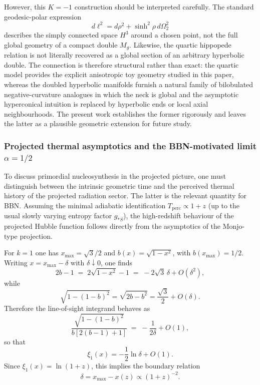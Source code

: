\documentclass[11pt]{article}
\begin{document}
However, this $K=-1$ construction should be interpreted carefully. The standard geodesic-polar expression
\begin{equation}
d\ell^2=d\rho^2+\sinh^2\rho\,d\Omega_2^2
\end{equation}
describes the simply connected space $H^3$ around a chosen point, not the full global geometry of a compact double $M_g$. Likewise, the quartic hippopede relation is not literally recovered as a global section of an arbitrary hyperbolic double. The connection is therefore structural rather than exact: the quartic model provides the explicit anisotropic toy geometry studied in this paper, whereas the doubled hyperbolic manifolds furnish a natural family of bilobulated negative-curvature analogues in which the neck is global and the asymptotic hyperconical intuition is replaced by hyperbolic ends or local axial neighbourhoods. The present work establishes the former rigorously and leaves the latter as a plausible geometric extension for future study.


\subsubsection*{Projected thermal asymptotics and the BBN-motivated limit $\alpha=1/2$}

To discuss primordial nucleosynthesis in the projected picture, one must distinguish between the intrinsic geometric time and the perceived thermal history of the projected radiation sector. The latter is the relevant quantity for BBN. Assuming the minimal adiabatic identification $T_{\mathrm{perc}}\propto 1+z$ (up to the usual slowly varying entropy factor $g_{*S}$), the high-redshift behaviour of the projected Hubble function follows directly from the asymptotics of the Monjo-type projection.

For $k=1$ one has $x_{\max}=\sqrt{3}/2$ and $b(x)=\sqrt{1-x^2}$, with $b(x_{\max})=1/2$. Writing $x=x_{\max}-\delta$ with $\delta\downarrow0$, one finds
\begin{equation}
2b-1\;=\;2\sqrt{1-x^2}-1\;=\;-2\sqrt{3}\,\delta+O(\delta^2),
\end{equation}
while
\begin{equation}
\sqrt{1-(1-b)^2}=\sqrt{2b-b^2}=\frac{\sqrt{3}}{2}+O(\delta).
\end{equation}
Therefore the line-of-sight integrand behaves as
\begin{equation}
\frac{\sqrt{1-(1-b)^2}}{b[2(b-1)+1]}
\;=\; -\frac{1}{2\delta}+O(1),
\end{equation}
so that
\begin{equation}
\xi_1(x)= -\frac12\ln\delta + O(1).
\end{equation}
Since $\xi_1(x)=\ln(1+z)$, this implies the boundary relation
\begin{equation}
\delta=x_{\max}-x(z)\propto (1+z)^{-2}.
\end{equation}
\end{document}

